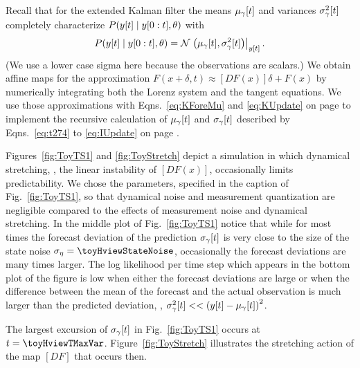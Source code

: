 Recall that for the extended Kalman filter the means
${\mu_\gamma}{[t]}$ and variances ${\sigma^2_\gamma}{[t]}$ completely
characterize $ P({y}{[t]}\mid y[0:t],\theta)$ with
\begin{equation*}
  P({y}{[t]}\mid y[0:t],\theta) =
  {\mathcal{N}}\left.\left({\mu_\gamma}{[t]},{\sigma^2_\gamma}{[t]}\right)\right|_{{y}{[t]}}.
\end{equation*}
(We use a lower case sigma here because the observations are scalars.)
We obtain affine maps for the approximation $F(x+\delta,t) \approx
\left[ DF(x)\right]\delta + F(x)$ %
%
by numerically integrating both the Lorenz system and the tangent
equations.  We use those approximations with Eqns.~\eqref{eq:KForeMu}
and \eqref{eq:KUpdate} on page \pageref{eq:KUpdate} to implement the
recursive calculation of ${\mu_\gamma}{[t]}$ and
${\sigma_\gamma}{[t]}$ described by Eqns.~\eqref{eq:t274} to
\eqref{eq:IUpdate} on page \pageref{eq:IUpdate}.

Figures~\ref{fig:ToyTS1} and \ref{fig:ToyStretch} depict a simulation
in which dynamical stretching, \ie, the linear instability of
$\left[ DF(x)\right]$, occasionally limits predictability.  We chose
the parameters, specified in the caption of Fig.~\ref{fig:ToyTS1}, so
that dynamical noise and measurement quantization are negligible
compared to the effects of measurement noise and dynamical stretching.
In the middle plot of Fig.~\ref{fig:ToyTS1} notice that while for most
times the forecast deviation of the prediction ${\sigma_\gamma}{[t]}$
is very close to the size of the state noise
$\sigma_\eta = \toyHviewStateNoise$, occasionally the forecast
deviations are many times larger.  The log likelihood per time step
which appears in the bottom plot of the figure is low when either the
forecast deviations are large or when the difference between the mean
of the forecast and the actual observation is much larger than the
predicted deviation, \ie,
${\sigma^2_\gamma}{[t]} <<
\left({y}{[t]}-{\mu_\gamma}{[t]}\right)^2$.

The largest excursion of ${\sigma_\gamma}{[t]}$ in
Fig.~\ref{fig:ToyTS1} occurs at $t=\toyHviewTMaxVar$.
Figure~\ref{fig:ToyStretch} illustrates the stretching action of the
map $[DF]$ that occurs then.

